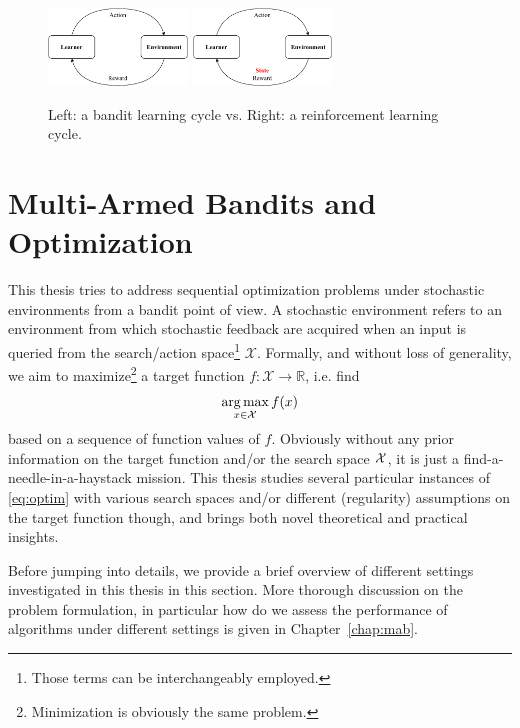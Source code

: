 \begin{figure}[ht]
    \centering
    \includegraphics[width=0.33\textwidth]{Chapter1/img/mab.pdf}
    \includegraphics[width=0.33\textwidth]{Chapter1/img/rl.pdf}
    \caption{Left: a bandit learning cycle vs. Right: a reinforcement learning cycle.}
    \label{fig:intro.comparison}
\end{figure}

\section{Multi-Armed Bandits and Optimization}\label{sec:intro.mab}
    
This thesis tries to address sequential optimization problems under stochastic environments from a bandit point of view. A stochastic environment refers to an environment from which stochastic feedback are acquired when an input is queried from the search/action space\footnote{Those terms can be interchangeably employed.} $\mathcal{X}$. Formally, and without loss of generality, we aim to maximize\footnote{Minimization is obviously the same problem.} a target function $f:\mathcal{X}\rightarrow\mathbb{R}$, i.e. find 
\begin{equation}\label{eq:optim}
    \operatorname*{arg\,max}_{x\in\mathcal{X}} f(x)
\end{equation}
based on a sequence of function values of $f$. Obviously without any prior information on the target function and/or the search space $\mathcal{X}$, it is just a find-a-needle-in-a-haystack mission. This thesis studies several particular instances of \eqref{eq:optim} with various search spaces and/or different (regularity) assumptions on the target function though, and brings both novel theoretical and practical insights. 

Before jumping into details, we provide a brief overview of different settings investigated in this thesis in this section. More thorough discussion on the problem formulation, in particular how do we assess the performance of algorithms under different settings is given in Chapter~\ref{chap:mab}.

